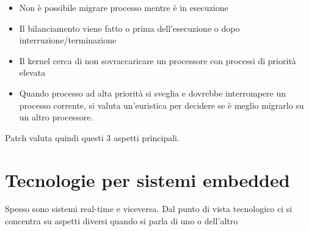 \documentclass{article}
\begin{document}
\begin{itemize}
\item Non è possibile migrare processo mentre è in esecuzione
\item Il bilanciamento viene fatto o prima dell'esecuzione o dopo interruzione/terminazione
\item Il kernel cerca di non sovraccaricare un processore con processi di priorità elevata
\item Quando processo ad alta priorità si sveglia e dovrebbe interrompere un processo corrente, si valuta un'euristica per decidere se è meglio migrarlo su un altro processore.
\end{itemize}
Patch valuta quindi questi 3 aspetti principali.
\section{Tecnologie per sistemi embedded}
Spesso sono sistemi real-time e viceversa. Dal punto di vista tecnologico ci si concentra su aspetti diversi quando si parla di uno o dell'altro
\end{document}
